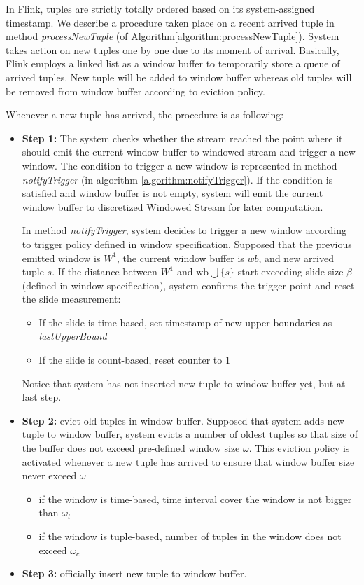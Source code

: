 In Flink, tuples are strictly totally ordered based on its system-assigned timestamp. We describe a procedure taken place on a recent arrived tuple in method \textit{processNewTuple}  (of Algorithm\ref{algorithm:processNewTuple}). 
System takes action on new tuples one by one due to its moment of arrival. 
Basically, Flink employs a linked list as a window buffer to temporarily store a queue of arrived tuples. New tuple will be added to window buffer whereas old tuples will be removed from window buffer according to eviction policy.

Whenever a new tuple has arrived, the procedure is as following:
\begin{itemize}
\item \textbf{Step 1:} The system checks whether the stream reached the point where it should emit the current window buffer to windowed stream and trigger a new window. The condition to trigger a new window is represented in method \textit{notifyTrigger} (in algorithm \ref{algorithm:notifyTrigger}). If the condition is satisfied and window buffer is not empty, system will emit the current window buffer to discretized Windowed Stream for later computation.  

In method \textit{notifyTrigger}, system decides to trigger a new window according to trigger policy defined in window specification. 
Supposed that the previous emitted window is $W^1$, the current window buffer is $wb$, and new arrived tuple $s$.
If the distance between $W^1$ and $\textrm{wb} \bigcup \{s\}$ start exceeding slide size $\beta$ (defined in window specification), system confirms the trigger point and reset the slide measurement:
\begin{itemize}
\item If the slide is time-based, set timestamp of new upper boundaries as \textit{lastUpperBound}
\item If the slide is count-based, reset counter to 1

\end{itemize}

Notice that system has not inserted new tuple to window buffer yet, but at last step.

\item \textbf{Step 2: }evict old tuples in window buffer.
Supposed that system adds new tuple to window buffer, system evicts a number of oldest tuples so that size of the buffer does not exceed pre-defined window size $\omega$. This eviction policy is activated whenever a new tuple has arrived to ensure that window buffer size  never exceed $\omega$
\begin{itemize}
	\item if the window is time-based, time interval cover the window is not bigger than $\omega_t$
	\item if the window is tuple-based, number of tuples in the window does not exceed $\omega_c$
\end{itemize}
\item \textbf{Step 3:} officially insert new tuple to window buffer.
\end{itemize}

